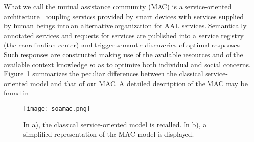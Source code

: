 \documentclass{llncs}
\begin{document}
What we call the mutual assistance community (MAC) is a service-oriented architecture~\cite{Erl05} coupling
services provided by smart devices with services supplied by human beings into an alternative
organization for AAL services. Semantically annotated services and requests for services are
published into a service registry (the coordination center) and trigger semantic discoveries of
optimal responses. Such responses are constructed making use of the
available resources and of the available context knowledge so as to optimize both individual and social
concerns. Figure~\ref{f:soamac} summarizes the peculiar differences between the classical service-oriented
model and that of our MAC.
A detailed description of the MAC may be found in~\cite{SDGB10b}.

\begin{figure}[t]
{\texttt{[image: soamac.png]}}
\caption{In a), the classical service-oriented model is recalled. In b), a simplified representation 
of the MAC model is displayed.}
	\label{f:soamac}
\end{figure}
\end{document}
